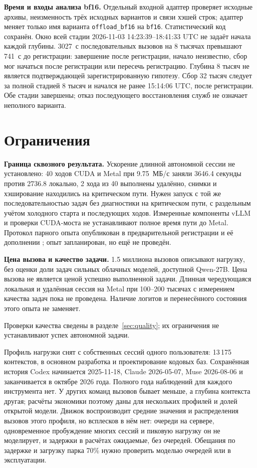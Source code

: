 \textbf{Время и входы анализа bf16.} Отдельный входной адаптер проверяет исходные архивы,
неизменность трёх исходных вариантов и связи хэшей строк; адаптер меняет только имя варианта
\texttt{offload\_bf16} на \texttt{bf16}. Статистический код сохранён.
Окно всей стадии 2026-11-03 14:23:39--18:41:33 UTC не задаёт начала каждой глубины.
3027~с последовательных вызовов на 8 тысячах превышают 741~с до регистрации:
завершение после регистрации, начало неизвестно, сбор мог начаться после регистрации или пересечь регистрацию.
Глубина 8 тысяч не является подтверждающей зарегистрированную гипотезу.
Сбор 32 тысяч следует за полной стадией 8 тысяч и начался не ранее 15:14:06 UTC, после регистрации.
Обе стадии завершены; отказ последующего восстановления служб не означает неполного варианта.



\section{Ограничения}
\label{sec:limits}



\textbf{Граница сквозного результата.} Ускорение длинной автономной сессии не установлено:
40 ходов CUDA и Metal при 9.75~МБ/с заняли 3646.4 секунды против 2736.8 локально,
2 хода из 40 выполнены удалённо, снимки и хэширование находились на критическом пути.
Нужен запуск с той же последовательностью задач без диагностики на критическом пути,
с раздельным учётом холодного старта и последующих ходов.
Измеренные компоненты vLLM и проверки CUDA-моста не устанавливают полное время пути до Metal.
Протокол парного опыта опубликован в предварительной регистрации и её дополнении
\cite{growingReplayPrereg}; опыт запланирован, но ещё не проведён.

\textbf{Цена вызова и качество задачи.} 1.5 миллиона вызовов описывают нагрузку, без оценки доли задач
сильных облачных моделей, доступной Qwen-27B. Цена вызова не является ценой успешно выполненной задачи.
Длинная чередующаяся локальная и удалённая сессия на Metal при 100--200 тысячах с измерением качества задач
пока не проведена. Наличие логитов и перенесённого состояния этого опыта не заменяет.

Проверки качества сведены в разделе~\ref{sec:quality}; их ограничения не устанавливают успех автономной задачи.

Профиль нагрузки снят с собственных сессий одного пользователя: 13\,175 контекстов, в основном разработка
и проектирование кодовых баз. Сохранённая история Codex начинается 2025-11-18, Claude 2026-05-07,
Muse 2026-08-06 и заканчивается в октябре 2026 года. Полного года наблюдений для каждого инструмента нет. У
других команд вызовов бывает меньше, а глубина контекста другая; расчёты экономики поэтому даны для нескольких профилей и долей открытой модели. Движок воспроизводит
средние значения и распределения вызовов этого профиля, но всплесков в нём нет: очереди на сервере, одновременное
пробуждение многих сессий и пиковую нагрузку он не моделирует, и задержки в расчётах ожидаемые, без очередей.
Обещания по задержке и загрузку парка 70\% нужно проверить моделью очередей или в эксплуатации.

